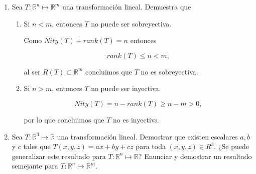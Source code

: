 \documentclass[10pt,a4paper]{article}
\theoremstyle{definition}
\newcommand{\R}{\mathbb{R}}
\begin{document}
\begin{enumerate}
    \item Sea $T : \R^n \longmapsto \R^m$ una transformación lineal. Demuestra que
    
    \begin{enumerate}
        \item Si $n < m$, entonces $T$ no puede ser sobreyectiva.
        
        Como $Nity(T) + rank(T) = n$ entonces

        \[rank(T) \leq n < m,\]

        al ser $R(T) \subset \R^m$ concluimos que $T$ no es sobreyectiva.

        \item Si $n > m$, entonces $T$ no puede ser inyectiva.
        
        \[Nity(T) = n - rank(T) \geq n - m > 0,\]

        por lo que concluimos que $T$ no es inyectiva.

    \end{enumerate}

    \item Sea $T : \R^3 \longmapsto \R$ una transformación lineal. Demostrar que existen escalares $a, b$ y $c$ tales que $T (x, y, z) = ax + by + cz$ para toda $(x, y, z) \in R^3$. ¿Se puede generalizar este resultado para $T : \R^n \longmapsto \R$? Enunciar y demostrar un resultado semejante para $T : \R^n \longmapsto \R^m$.
    
    

\end{enumerate}
\end{document}
